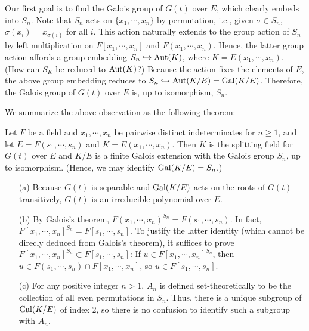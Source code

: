 Our first goal is to find the Galois group of $G(t)$ over $E$, which clearly embeds into $S_n$.
Note that $S_n$ acts on $\{x_1, \cdots, x_n\}$ by permutation, i.e., given $\sigma\in S_n$, $\sigma(x_i)=x_{\sigma(i)}$ for all $i$.
This action naturally extends to the group action of $S_n$ by left multiplication on $F[x_1, \cdots, x_n]$ and $F(x_1, \cdots, x_n)$.
Hence, the latter group action affords a group embedding $S_n\hookrightarrow{\textrm{Aut}({K})}$, where $K=E(x_1, \cdots, x_n)$. \color{brown}(How can $S_K$ be reduced to ${\textrm{Aut}({K})}$?) \color{black}
Because the action fixes the elements of $E$, the above group embedding reduces to $S_n\hookrightarrow{\textrm{Aut}({K/E})}={\textrm{Gal}({K/E})}$.
Therefore, the Galois group of $G(t)$ over $E$ is, up to isomorphism, $S_n$.

We summarize the above observation as the following theorem:
\begin{thm}
    Let $F$ be a field and $x_1, \cdots, x_n$ be pairwise distinct indeterminates for $n\geq 1$, and let $E=F(s_1, \cdots, s_n)$ and $K=E(x_1, \cdots, x_n)$.
    Then $K$ is the splitting field for $G(t)$ over $E$ and $K/E$ is a finite Galois extension with the Galois group $S_n$, up to isomorphism.
    (Hence, we may identify ${\textrm{Gal}({K/E})}=S_n$.)
\end{thm}
\begin{rmk}
    \begin{enumerate}
        \item[(a)]
        {
            Because $G(t)$ is separable and ${\textrm{Gal}({K/E})}$ acts on the roots of $G(t)$ transitively, $G(t)$ is an irreducible polynomial over $E$.
        }
        \item[(b)]
        {
            By Galois's theorem, $F(x_1, \cdots, x_n)^{S_n}=F(s_1, \cdots, s_n)$.
            In fact, $F[x_1, \cdots, x_n]^{S_n}=F[s_1, \cdots, s_n]$.
            To justify the latter identity (which cannot be direcly deduced from Galois's theorem), it suffices to prove $F[x_1, \cdots, x_n]^{S_n}\subset F[s_1, \cdots, s_n]$: If $u\in F[x_1, \cdots, x_n]^{S_n}$, then $u\in F(s_1, \cdots, s_n)\cap F[x_1, \cdots, x_n]$, so $u\in F[s_1, \cdots, s_n]$.
        }
        \item[(c)]
        {
            For any positive integer $n>1$, $A_n$ is defined set-theoretically to be the collection of all even permutations in $S_n$.
            Thus, there is a unique subgroup of ${\textrm{Gal}({K/E})}$ of index 2, so there is no confusion to identify such a subgroup with $A_n$.
        }
    \end{enumerate}
\end{rmk}

